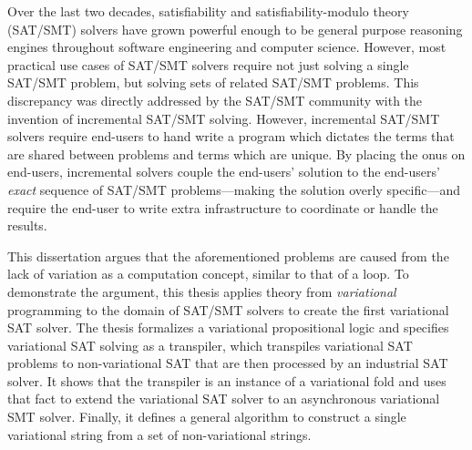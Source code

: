 Over the last two decades, satisfiability and satisfiability-modulo theory
(SAT/SMT) solvers have grown powerful enough to be general purpose reasoning
engines throughout software engineering and computer science. However, most
practical use cases of SAT/SMT solvers require not just solving a single SAT/SMT
problem, but solving sets of related SAT/SMT problems. This discrepancy was
directly addressed by the SAT/SMT community with the invention of incremental
SAT/SMT solving. However, incremental SAT/SMT solvers require end-users to hand
write a program which dictates the terms that are shared between problems and
terms which are unique. By placing the onus on end-users, incremental solvers
couple the end-users' solution to the end-users' \emph{exact} sequence of
SAT/SMT problems---making the solution overly specific---and require the
end-user to write extra infrastructure to coordinate or handle the results.

This dissertation argues that the aforementioned problems are caused from the
lack of variation as a computation concept, similar to that of a 
loop. To demonstrate the argument, this thesis applies theory from
\emph{variational} programming to the domain of SAT/SMT solvers to create the
first variational SAT solver.
%
The thesis formalizes a variational propositional logic and specifies
variational SAT solving as a transpiler, which transpiles variational SAT
problems to non-variational SAT that are then processed by an industrial SAT
solver. It shows that the transpiler is an instance of a variational fold and
uses that fact to extend the variational SAT solver to an asynchronous
variational SMT solver. Finally, it defines a general algorithm to construct a
single variational string from a set of non-variational strings.



